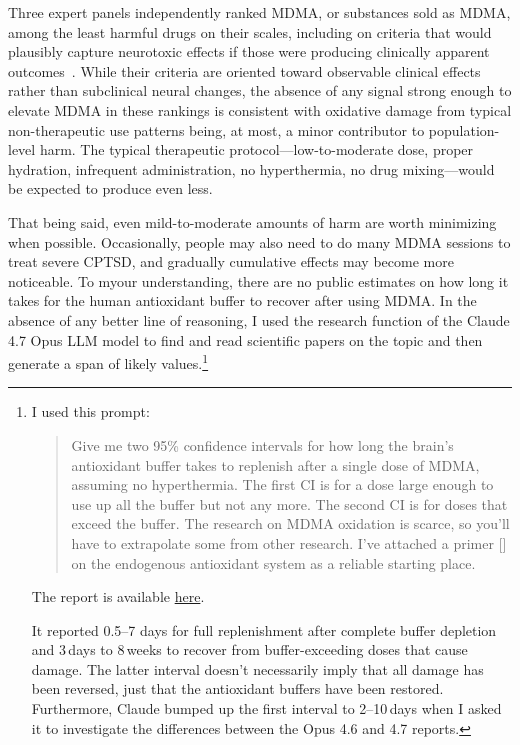\documentclass[11pt,oneside]{book}
\let\cite\parencite
\begin{document}
Three expert panels independently ranked MDMA, or substances sold as MDMA, among the least harmful drugs on their scales, including on criteria that would plausibly capture neurotoxic effects if those were producing clinically apparent outcomes~\cite{nuttDrugHarms,bonomoHarms,crossinHarms}. While their criteria are oriented toward observable clinical effects rather than subclinical neural changes, the absence of any signal strong enough to elevate MDMA in these rankings is consistent with oxidative damage from typical non-therapeutic use patterns being, at most, a minor contributor to population-level harm. The typical therapeutic protocol---low-to-moderate dose, proper hydration, infrequent administration, no hyperthermia, no drug mixing---would be expected to produce even less.

That being said, even mild-to-moderate amounts of harm are worth minimizing when possible. Occasionally, people may also need to do many MDMA sessions to treat severe CPTSD, and gradually cumulative effects may become more noticeable. To myour understanding, there are no public estimates on how long it takes for the human antioxidant buffer to recover after using MDMA. In the absence of any better line of reasoning, I used the research function of the Claude 4.7 Opus LLM model to find and read scientific papers on the topic and then generate a span of likely values.\footnote{
    I used this prompt:
    \begin{quotation}
        Give me two 95\% confidence intervals for how long the brain's antioxidant buffer takes to replenish after a single dose of MDMA, assuming no hyperthermia. The first CI is for a dose large enough to use up all the buffer but not any more. The second CI is for doses that exceed the buffer. The research on MDMA oxidation is scarce, so you'll have to extrapolate some from other research. I've attached a primer [\textcite{jomovaAntioxidant}] on the endogenous antioxidant system as a reliable starting place.
    \end{quotation}

    The report is available \href{https://github.com/groeneveld/mdma-guide/blob/main/auxillaryFiles/claude\_fifth\_antioxidant\_report.pdf}{here}.

    It reported 0.5--7 days for full replenishment after complete buffer depletion and 3\,days to 8\,weeks to recover from buffer-exceeding doses that cause damage. The latter interval doesn't necessarily imply that all damage has been reversed, just that the antioxidant buffers have been restored. Furthermore, Claude bumped up the first interval to 2--10\,days when I asked it to investigate the differences between the Opus 4.6 and 4.7 reports.
    
}
\end{document}
